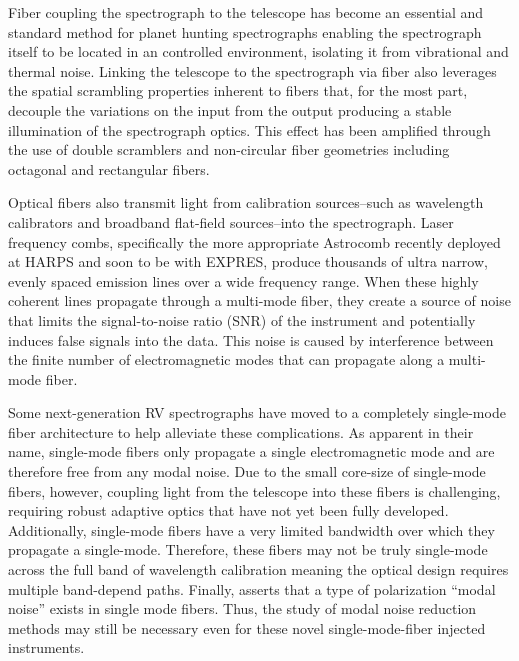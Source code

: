 \documentclass[twocolumn]{emulateapj}
\begin{document}
Fiber coupling the spectrograph to the telescope has become an essential and standard method for planet hunting spectrographs enabling the spectrograph itself to be located in an controlled environment, isolating it from vibrational and thermal noise. Linking the telescope to the spectrograph via fiber also leverages the spatial scrambling properties inherent to fibers that, for the most part, decouple the variations on the input from the output producing a stable illumination of the spectrograph optics\citep{Hunter1992}. This effect has been amplified through the use of double scramblers \citep{Halverson2015a, Spronck2015} and non-circular fiber geometries including octagonal and rectangular fibers\citep{Chazelas2010, SPronck2012, Plavchan2013}.

Optical fibers also transmit light from calibration sources--such as wavelength calibrators and broadband flat-field sources--into the spectrograph. Laser frequency combs, specifically the more appropriate Astrocomb \citep{Probst2014} recently deployed at HARPS and soon to be with EXPRES, produce thousands of ultra narrow, evenly spaced emission lines over a wide frequency range. When these highly coherent lines propagate through a multi-mode fiber, they create a source of noise that limits the signal-to-noise ratio (SNR) of the instrument and potentially induces false signals into the data. This noise is caused by interference between the finite number of electromagnetic modes that can propagate along a multi-mode fiber.%

Some next-generation RV spectrographs \citep[e.g. iLocater,][]{Crepp2016} have moved to a completely single-mode fiber architecture to help alleviate these complications. As apparent in their name, single-mode fibers only propagate a single electromagnetic mode and are therefore free from any modal noise. Due to the small core-size of single-mode fibers, however, coupling light from the telescope into these fibers is challenging, requiring robust adaptive optics that have not yet been fully developed. Additionally, single-mode fibers have a very limited bandwidth over which they propagate a single-mode. Therefore, these fibers may not be truly single-mode across the full band of wavelength calibration meaning the optical design requires multiple band-depend paths. Finally, \citet{Halverson2015b} asserts that a type of polarization ``modal noise'' exists in single mode fibers. Thus, the study of modal noise reduction methods may still be necessary even for these novel single-mode-fiber injected instruments.
\end{document}
